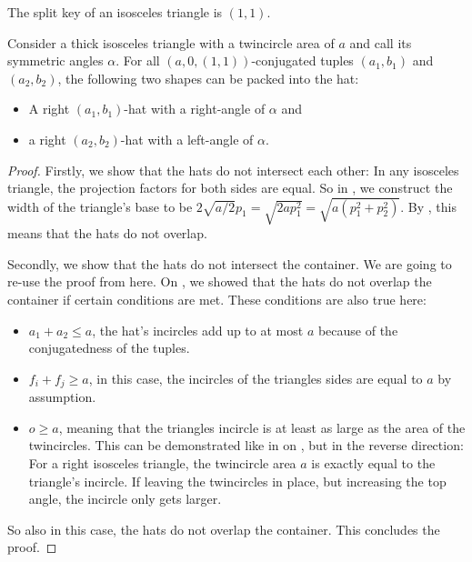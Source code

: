 \documentclass[a4paper,style=print,oneside,bibliography=totoc,nexus,lnum,extramargin]{tubsbook}
\begin{document}
\begin{definition}
    The split key of an isosceles triangle is $(1,1)$.
\end{definition}

\begin{lemma}\label{th:hats-in-iso}
    Consider a thick isosceles triangle with a twincircle area of $a$ and call its symmetric angles $\alpha$.
    For all $(a,0,(1,1))$-conjugated tuples $(a_1, b_1)$ and $(a_2, b_2)$, the following two shapes can be packed into the hat:
    \begin{itemize}
        \item A right $(a_1,b_1)$-hat with a right-angle of $\alpha$ and
        \item a right $(a_2,b_2)$-hat with a left-angle of $\alpha$.
    \end{itemize}
\end{lemma}

\begin{proof}
    Firstly, we show that the hats do not intersect each other: In any isosceles triangle, the projection factors for both sides are equal. So in , we construct the width of the triangle's base to be $2\sqrt{a/2}p_1 = \sqrt{2ap_1^2} = \sqrt{a(p_1^2+p_2^2)}$. By , this means that the hats do not overlap.


    Secondly, we show that the hats do not intersect the container. We are going to re-use the proof from  here. On , we showed that the hats do not overlap the container if certain conditions are met. These conditions are also true here:

    \begin{itemize}
        \item $a_1 + a_2 \le a$, the hat's incircles add up to at most $a$ because of the conjugatedness of the tuples.
        \item $f_i + f_j \ge a$, in this case, the incircles of the triangles sides are equal to $a$ by assumption.
        \item $o \ge a$, meaning that the triangles incircle is at least as large as the area of the twincircles. This can be demonstrated like in  on , but in the reverse direction: For a right isosceles triangle, the twincircle area $a$ is exactly equal to the triangle's incircle. If leaving the twincircles in place, but increasing the top angle, the incircle only gets larger.
    \end{itemize}

    So also in this case, the hats do not overlap the container. This concludes the proof.
\end{proof}
\end{document}
